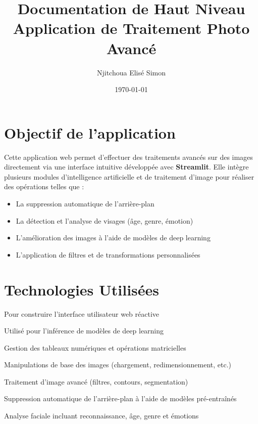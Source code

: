 \documentclass[a4paper,12pt]{article}
\title{Documentation de Haut Niveau\\Application de Traitement Photo Avancé}
\author{Njitchoua Elisé Simon}
\date{\today}
\begin{document}
\maketitle

\section*{Objectif de l'application}
Cette application web permet d’effectuer des traitements avancés sur des images directement via une interface intuitive développée avec \textbf{Streamlit}. Elle intègre plusieurs modules d’intelligence artificielle et de traitement d’image pour réaliser des opérations telles que :
\begin{itemize}
  \item La suppression automatique de l’arrière-plan
  \item La détection et l’analyse de visages (âge, genre, émotion)
  \item L’amélioration des images à l’aide de modèles de deep learning
  \item L'application de filtres et de transformations personnalisées
\end{itemize}

\section*{Technologies Utilisées}
\begin{description}[leftmargin=2cm]
  \item[Streamlit] Pour construire l'interface utilisateur web réactive
  \item[TensorFlow 2.13] Utilisé pour l’inférence de modèles de deep learning
  \item[NumPy] Gestion des tableaux numériques et opérations matricielles
  \item[PIL (Pillow)] Manipulations de base des images (chargement, redimensionnement, etc.)
  \item[OpenCV] Traitement d’image avancé (filtres, contours, segmentation)
  \item[rembg] Suppression automatique de l’arrière-plan à l’aide de modèles pré-entraînés
  \item[DeepFace] Analyse faciale incluant reconnaissance, âge, genre et émotions
\end{description}
\end{document}
